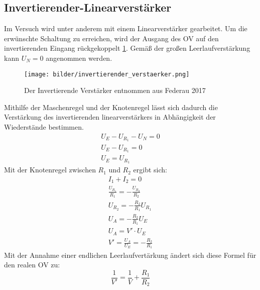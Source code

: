     \subsection{Invertierender-Linearverstärker}
        Im Versuch wird unter anderem mit einem Linearverstärker gearbeitet.
        Um die erwünschte Schaltung zu erreichen, wird der Ausgang des OV auf den invertierenden Eingang rückgekoppelt \ref{fig:inv_Ver}.
        Gemäß der großen Leerlaufverstärkung kann $U_N = 0$ angenommen werden.
        \begin{figure}[ht]
            \centering
            \texttt{[image: bilder/invertierender\_verstaerker.png]}
            \caption{Der Invertierende Verstärker entnommen aus Federau 2017}
            \label{fig:inv_Ver}
        \end{figure}
        Mithilfe der Maschenregel und der Knotenregel lässt sich dadurch die Verstärkung des invertierenden linearverstärkers in Abhängigkeit der Wiederstände bestimmen.
        \begin{align*}
            U_E -U_{R_1}-U_N = 0\\
            U_E -U_{R_1} = 0\\
            U_E = U_{R_1}
        \end{align*}
        Mit der Knotenregel zwischen $R_1$ und $R_2$ ergibt sich:
        \begin{align}
            I_1+I_2 = 0\nonumber\\
            \frac{U_{R_1}}{R_1} = -\frac{U_{R_2}}{R_2}\nonumber\\
            U_{R_2} = -\frac{R_2}{R_1} U_{R_1}\nonumber\\
            U_{A} = -\frac{R_2}{R_1} U_{E}\nonumber\\
            U_{A} = V' \cdot U_{E}\nonumber\\
            V' = \frac{U_A}{U_E} = -\frac{R_2}{R_1}
            \label{eqn:verstaerkung}
        \end{align}
        Mit der Annahme einer endlichen Leerlaufvertärkung ändert sich diese Formel für den realen OV zu:
        \begin{equation}
            \frac{1}{V'}= \frac{1}{V} +\frac{R_1}{R_2}
            \label{eqn:reale_verstaerkung}
        \end{equation}
